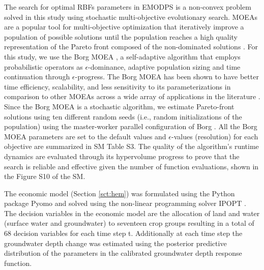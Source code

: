 \documentclass[a4paper,fleqn]{cas-sc}
\begin{document}
The search for optimal RBFs parameters in EMODPS is a non-convex problem \citep{giuliani_curses_2016} solved in this study using stochastic multi-objective evolutionary search. MOEAs are a popular tool for multi-objective optimization that iteratively improve a population of possible solutions  until the population reaches a high quality representation of the Pareto front composed of the non-dominated solutions \citep{coello_evolutionary_2007}. For this study, we use the Borg MOEA \citep{hadka_borg_2013}, a self-adaptive algorithm that employs probabilistic operators as $\epsilon$-dominance, adaptive population sizing and time continuation through $\epsilon$-progress. The Borg MOEA has been shown to have better time efficiency, scalability, and less sensitivity to its parameterizations in comparison to other MOEAs across a wide array of applications in the literature \citep{reed_evolutionary_2013,gupta_can_2020,zatarain_salazar_balancing_2017,seyedashraf_assisting_2023,al-jawad_reservoir_2017}. Since the Borg MOEA is a stochastic algorithm, we estimate Pareto-front solutions using ten different random seeds (i.e., random initializations of the population) using the master-worker parallel configuration of Borg \citep{hadka_large-scale_2015}. All the Borg MOEA parameters are set to the default values \citep{hadka_borg_2013} and $\epsilon$-values (resolution) for each objective are summarized in SM Table S3. The quality of the algorithm's runtime dynamics are evaluated through its hypervolume progress \citep{hadka_diagnostic_2012} to prove that the search is reliable and effective given the number of function evaluations, shown in the Figure S10 of the SM.

The economic model (Section \ref{sct:hem}) was formulated using the Python package Pyomo \citep{hart_pyomo_2011} and solved using the non-linear programming solver IPOPT \citep{wachter_implementation_2006}. The decision variables in the economic model are the allocation of land and water (surface water and groundwater) to seventeen crop groups resulting in a total of 68 decision variables for each time step t. Additionally at each time step the groundwater depth change was estimated using the posterior predictive distribution of the parameters in the calibrated groundwater depth response function.
\end{document}
